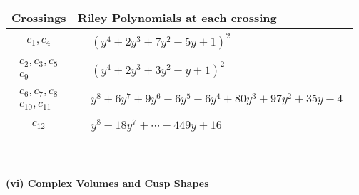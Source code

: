 \documentclass[1p]{elsarticle_modified}
\theoremstyle{definition}
\begin{document}
\begin{tabular}{m{50pt}|m{274pt}}
Crossings & \hspace{64pt}Riley Polynomials at each crossing \\
\hline $$\begin{aligned}c_{1},c_{4}\end{aligned}$$&$\begin{aligned}
&(y^4+2 y^3+7 y^2+5 y+1)^2
\end{aligned}$\\
\hline $$\begin{aligned}c_{2},c_{3},c_{5}\\c_{9}\end{aligned}$$&$\begin{aligned}
&(y^4+2 y^3+3 y^2+y+1)^2
\end{aligned}$\\
\hline $$\begin{aligned}c_{6},c_{7},c_{8}\\c_{10},c_{11}\end{aligned}$$&$\begin{aligned}
&y^8+6 y^7+9 y^6-6 y^5+6 y^4+80 y^3+97 y^2+35 y+4
\end{aligned}$\\
\hline $$\begin{aligned}c_{12}\end{aligned}$$&$\begin{aligned}
&y^8-18 y^7+\cdots-449 y+16
\end{aligned}$\\
\hline
\end{tabular}\\~\\
\newpage\flushleft \textbf{(vi) Complex Volumes and Cusp Shapes}
\end{document}
